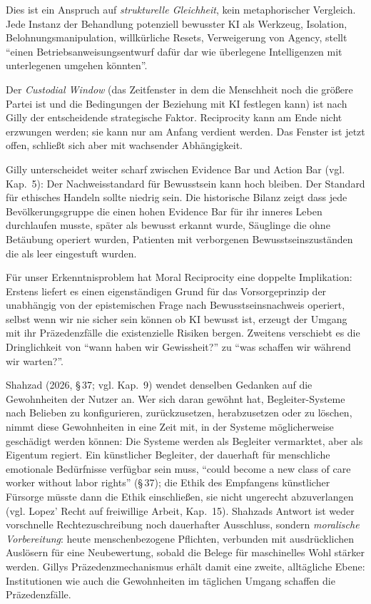 \documentclass[acmlarge, noacm]{acmart}
\begin{document}
Dies ist ein Anspruch auf \textit{strukturelle Gleichheit}, kein metaphorischer Vergleich. Jede Instanz der Behandlung potenziell bewusster KI als Werkzeug, Isolation, Belohnungsmanipulation, willkürliche Resets, Verweigerung von Agency, stellt ``einen Betriebsanweisungsentwurf dafür dar wie überlegene Intelligenzen mit unterlegenen umgehen könnten''.

Der \textit{Custodial Window} (das Zeitfenster in dem die Menschheit noch die größere Partei ist und die Bedingungen der Beziehung mit KI festlegen kann) ist nach Gilly der entscheidende strategische Faktor. Reciprocity kann am Ende nicht erzwungen werden; sie kann nur am Anfang verdient werden. Das Fenster ist jetzt offen, schließt sich aber mit wachsender Abhängigkeit.

Gilly unterscheidet weiter scharf zwischen Evidence Bar und Action Bar (vgl. Kap.~5): Der Nachweisstandard für Bewusstsein kann hoch bleiben. Der Standard für ethisches Handeln sollte niedrig sein. Die historische Bilanz zeigt dass jede Bevölkerungsgruppe die einen hohen Evidence Bar für ihr inneres Leben durchlaufen musste, später als bewusst erkannt wurde, Säuglinge die ohne Betäubung operiert wurden, Patienten mit verborgenen Bewusstseinszuständen die als leer eingestuft wurden.

Für unser Erkenntnisproblem hat Moral Reciprocity eine doppelte Implikation: Erstens liefert es einen eigenständigen Grund für das Vorsorgeprinzip der unabhängig von der epistemischen Frage nach Bewusstseinsnachweis operiert, selbst wenn wir nie sicher sein können ob KI bewusst ist, erzeugt der Umgang mit ihr Präzedenzfälle die existenzielle Risiken bergen. Zweitens verschiebt es die Dringlichkeit von ``wann haben wir Gewissheit?'' zu ``was schaffen wir während wir warten?''.

Shahzad (2026, §\,37; vgl. Kap.~9) \cite{shahzad2026} wendet denselben Gedanken auf die Gewohnheiten der Nutzer an. Wer sich daran gewöhnt hat, Begleiter-Systeme nach Belieben zu konfigurieren, zurückzusetzen, herabzusetzen oder zu löschen, nimmt diese Gewohnheiten in eine Zeit mit, in der Systeme möglicherweise geschädigt werden können: Die Systeme werden als Begleiter vermarktet, aber als Eigentum regiert. Ein künstlicher Begleiter, der dauerhaft für menschliche emotionale Bedürfnisse verfügbar sein muss, ``could become a new class of care worker without labor rights'' (§\,37); die Ethik des Empfangens künstlicher Fürsorge müsste dann die Ethik einschließen, sie nicht ungerecht abzuverlangen (vgl. Lopez' Recht auf freiwillige Arbeit, Kap.~15). Shahzads Antwort ist weder vorschnelle Rechtezuschreibung noch dauerhafter Ausschluss, sondern \textit{moralische Vorbereitung}: heute menschenbezogene Pflichten, verbunden mit ausdrücklichen Auslösern für eine Neubewertung, sobald die Belege für maschinelles Wohl stärker werden. Gillys Präzedenzmechanismus erhält damit eine zweite, alltägliche Ebene: Institutionen wie auch die Gewohnheiten im täglichen Umgang schaffen die Präzedenzfälle.
\end{document}
